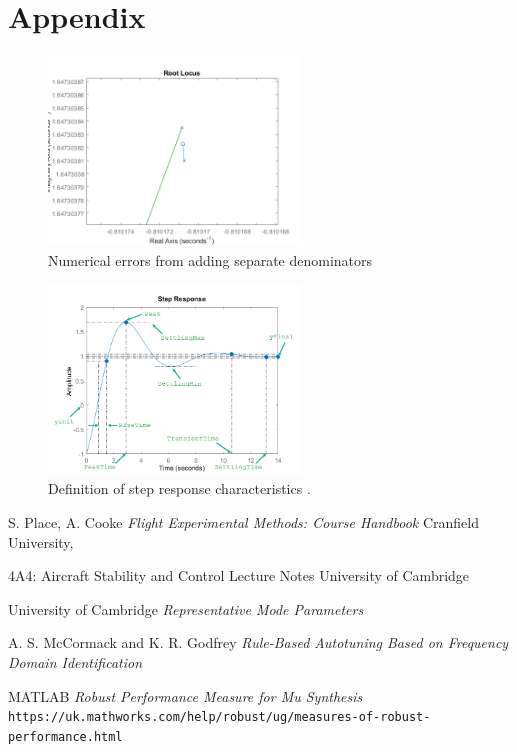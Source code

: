 \documentclass{article}
\begin{document}
\section{Appendix}

\begin{figure}[H]
    \centering
    \includegraphics[width=0.6\textwidth]{figures/numerical_errors.png}
    \caption{Numerical errors from adding separate denominators}
    \label{fig:matlab_numerical_errors}
\end{figure}

\begin{figure}[H]
    \centering
    \includegraphics[width=0.6\textwidth]{figures/step-characteristics.png}
    \caption{Definition of step response characteristics \cite{matlab}.}
    \label{fig:matlab_step_chics}
\end{figure}

\begin{thebibliography}{9}

    S. Place, A. Cooke
    \emph{Flight Experimental Methods: Course Handbook}
    Cranfield University,

    4A4: Aircraft Stability and Control Lecture Notes
    University of Cambridge

    University of Cambridge
    \emph{Representative Mode Parameters}

    A. S. McCormack and K. R. Godfrey
    \emph{Rule-Based Autotuning Based on Frequency Domain Identification}

    MATLAB
    \emph{Robust Performance Measure for Mu Synthesis}
    \texttt{https://uk.mathworks.com/help/robust/ug/measures-of-robust-performance.html}
    

\end{thebibliography}
\end{document}
